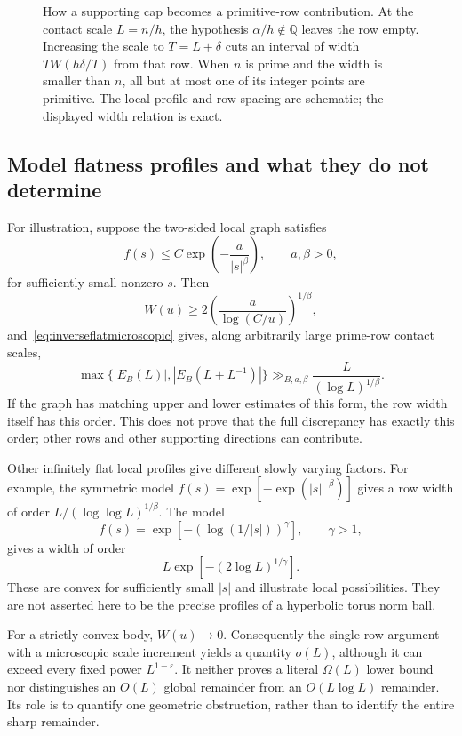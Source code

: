 \begin{figure}[htbp]
\caption[A flat supporting cap and a primitive-row burst]{How a supporting cap becomes a primitive-row contribution.
At the contact scale $L=n/h$, the hypothesis $\alpha/h\notin\mathbb Q$
leaves the row empty. Increasing the scale to $T=L+\delta$ cuts an interval
of width $TW(h\delta/T)$ from that row. When $n$ is prime and the width
is smaller than $n$, all but at most one of its integer points are
primitive. The local profile and row spacing are schematic; the
displayed width relation is exact.}
\label{fig:mono-flat-row}
\end{figure}

\subsection{Model flatness profiles and what they do not determine}
\label{subsec:flatnessmodels}

For illustration, suppose the two-sided local graph satisfies
\[
 f(s)\leq C\exp\!\left(-\frac a{|s|^\beta}\right),
 \qquad a,\beta>0,
\]
for sufficiently small nonzero $s$. Then
\[
 W(u)\geq
 2\left(\frac a{\log(C/u)}\right)^{1/\beta},
\]
and~\eqref{eq:inverseflatmicroscopic} gives, along arbitrarily large
prime-row contact scales,
\begin{equation}
 \max\{|E_B(L)|,|E_B(L+L^{-1})|\}
 \gg_{B,a,\beta}\frac L{(\log L)^{1/\beta}}.
 \label{eq:exponentialflatrow}
\end{equation}
If the graph has matching upper and lower estimates of this form, the
row width itself has this order. This does not prove that the full
discrepancy has exactly this order; other rows and other supporting
directions can contribute.

Other infinitely flat local profiles give different slowly varying
factors. For example, the symmetric model
$f(s)=\exp[-\exp(|s|^{-\beta})]$ gives a row width of order
$L/(\log\log L)^{1/\beta}$. The model
\[
 f(s)=\exp[-(\log(1/|s|))^\gamma],\qquad\gamma>1,
\]
gives a width of order
\[
 L\exp[-(2\log L)^{1/\gamma}].
\]
These are convex for sufficiently small $|s|$ and illustrate local
possibilities. They are not asserted here to be the precise profiles
of a hyperbolic torus norm ball.

For a strictly convex body, $W(u)\to0$. Consequently the single-row
argument with a microscopic scale increment yields a quantity $o(L)$,
although it can exceed every fixed power $L^{1-\varepsilon}$.
It neither proves a literal $\Omega(L)$ lower bound nor distinguishes
an $O(L)$ global remainder from an $O(L\log L)$ remainder. Its role is
to quantify one geometric obstruction, rather than to identify the
entire sharp remainder.

